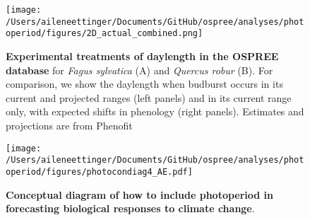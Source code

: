 \documentclass{article}
\begin{document}
 
 
\begin{figure}[p]
\texttt{[image: /Users/aileneettinger/Documents/GitHub/ospree/analyses/photoperiod/figures/2D\_actual\_combined.png]} 
\caption{\textbf{Experimental treatments of daylength in the OSPREE database} for \textit{Fagus sylvatica} (A) and \textit{Quercus robur} (B). For comparison, we show the daylength when budburst occurs in its current and projected ranges (left panels) and in its current range only, with expected shifts in phenology (right panels). Estimates and projections are from Phenofit \citep{duputie2015}}
 \label{fig:fagus}
 \end{figure}
 
\begin{figure}[p]
\texttt{[image: /Users/aileneettinger/Documents/GitHub/ospree/analyses/photoperiod/figures/photocondiag4\_AE.pdf]} 
\caption{\textbf{Conceptual diagram of how to include photoperiod in forecasting biological responses to climate change}.}
 \label{fig:condiag}
 \end{figure}

\end{document}
